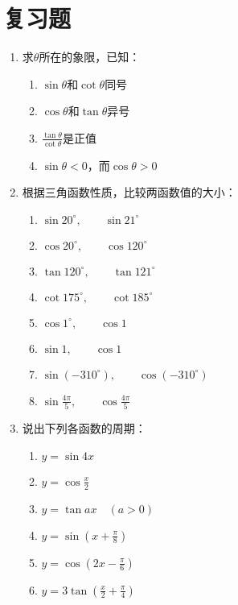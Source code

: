\section*{复习题}
\begin{enumerate}
    \item 求$\theta$所在的象限，已知：
\begin{multicols}{2}
\begin{enumerate}
    \item $\sin\theta$和$\cot \theta$同号
    \item $\cos\theta$和$\tan \theta$异号
    \item $\frac{\tan\theta}{\cot\theta}$是正值
    \item $\sin\theta <0$，而$\cos\theta>0$
\end{enumerate}
\end{multicols}
\item 根据三角函数性质，比较两函数值的大小：
\begin{multicols}{2}
    \begin{enumerate}
        \item $\sin 20^{\circ},\qquad \sin 21^{\circ}$
        \item $\cos 20^{\circ},\qquad \cos 120^{\circ}$
        \item $\tan 120^{\circ},\qquad \tan 121^{\circ}$
        \item $\cot175^{\circ},\qquad \cot 185^{\circ}$
        \item $\cos 1^{\circ},\qquad \cos 1$
        \item $\sin 1,\qquad \cos 1$
        \item $\sin(-310^{\circ}),\qquad \cos(-310^{\circ})$
        \item $\sin\frac{4\pi}{5},\qquad \cos\frac{4\pi}{5}$
    \end{enumerate}
    \end{multicols}


\item 说出下列各函数的周期：
\begin{multicols}{2}
\begin{enumerate}
    \item $y=\sin 4x$
    \item $y=\cos\frac{x}{2}$
    \item $y=\tan ax \quad (a>0)$
    \item $y=\sin\left(x+\frac{\pi}{8}\right)$
    \item $y=\cos\left(2x-\frac{\pi}{6}\right)$
    \item $y=3\tan\left(\frac{x}{2}+\frac{\pi}{4}\right)$
\end{enumerate}
\end{multicols}


\end{enumerate}
